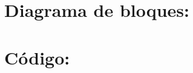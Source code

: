 \documentclass[a4paper,11pt]{article} %
\begin{document}
    \section{Diagrama de bloques:} \label{section:DiagBloques}
    
        
    \section{Código:} \label{section:Codigo}
    
        
    
\end{document}
